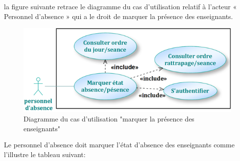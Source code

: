 \documentclass[12 pt ]{report}
\begin{document}
la figure suivante retrace le diagramme du cas d’utilisation  relatif à l’acteur « Personnel d'absence » qui a le droit de  marquer la présence des enseignants.
\begin{figure}[h]
 \begin{center}
\includegraphics[width=13 cm ,height=5 cm]{mar_abs.PNG}
\caption{Diagramme du cas d’utilisation "marquer la présence des enseignants"}
\end{center}
\end{figure}
\newpage
Le personnel d'absence doit marquer l'état d'absence des enseignants comme l’illustre le tableau suivant:
\end{document}
